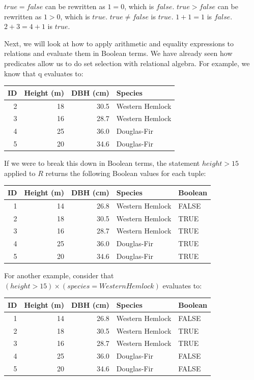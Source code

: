 \documentclass[
]{book}
\begin{document}
\(true=false\) can be rewritten as \(1=0\), which is \(false\).
\(true>false\) can be rewritten as \(1>0\), which is \(true\).
\(true≠false\) is \(true\).
\(1+1=1\) is \(false\).
\(2+3=4+1\) is \(true\).

Next, we will look at how to apply arithmetic and equality expressions to relations and evaluate them in Boolean terms. We have already seen how predicates allow us to do set selection with relational algebra. For example, we know that q evaluates to:

\begin{tabular}{rrrl}
\toprule
ID & Height (m) & DBH (cm) & Species\\
\midrule
2 & 18 & 30.5 & Western Hemlock\\
3 & 16 & 28.7 & Western Hemlock\\
4 & 25 & 36.0 & Douglas-Fir\\
5 & 20 & 34.6 & Douglas-Fir\\
\bottomrule
\end{tabular}

If we were to break this down in Boolean terms, the statement \(height>15\) applied to \(R\) returns the following Boolean values for each tuple:

\begin{tabular}{rrrll}
\toprule
ID & Height (m) & DBH (cm) & Species & Boolean\\
\midrule
1 & 14 & 26.8 & Western Hemlock & FALSE\\
2 & 18 & 30.5 & Western Hemlock & TRUE\\
3 & 16 & 28.7 & Western Hemlock & TRUE\\
4 & 25 & 36.0 & Douglas-Fir & TRUE\\
5 & 20 & 34.6 & Douglas-Fir & TRUE\\
\bottomrule
\end{tabular}

For another example, consider that \((height>15)×(species=WesternHemlock)\) evaluates to:

\begin{tabular}{rrrll}
\toprule
ID & Height (m) & DBH (cm) & Species & Boolean\\
\midrule
1 & 14 & 26.8 & Western Hemlock & FALSE\\
2 & 18 & 30.5 & Western Hemlock & TRUE\\
3 & 16 & 28.7 & Western Hemlock & TRUE\\
4 & 25 & 36.0 & Douglas-Fir & FALSE\\
5 & 20 & 34.6 & Douglas-Fir & FALSE\\
\bottomrule
\end{tabular}
\end{document}
